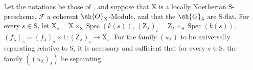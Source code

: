 \begin{theorem}[11.9.16]
\label{IV.11.9.16}
Let the notations be those of , and suppose that $\mathrm{X}$ is a locally Noetherian $\mathrm{S}$-prescheme, $\mathscr{F}$ a coherent $\sh{O}_\mathrm{X}$-Module, and that the $\sh{G}_\lambda$ are $\mathrm{S}$-flat.
For every $s\in\mathrm{S}$, let $\mathrm{X}_s=\mathrm{X}\times_\mathrm{S}\operatorname{Spec}(k(s))$, $(\mathrm{Z}_\lambda)_s=\mathrm{Z}_\lambda\times_\mathrm{S}\operatorname{Spec}(k(s))$, $(f_\lambda)_s=(f_\lambda)_s\times 1:(\mathrm{Z}_\lambda)_s\to\mathrm{X}_s$.
For the family $(u_\lambda)$ to be universally separating relative to $\mathrm{S}$, it is necessary and sufficient that for every $s\in\mathrm{S}$, the family $((u_\lambda)_s)$ be separating.
\end{theorem}

